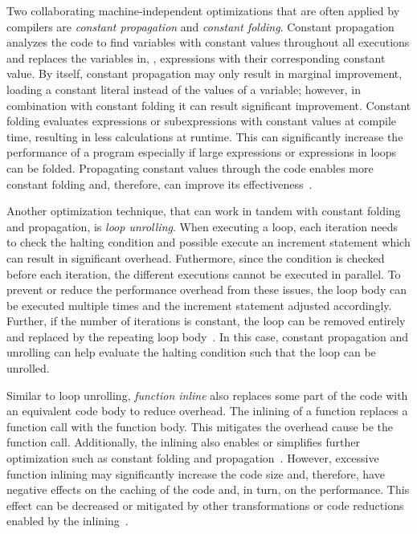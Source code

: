 Two collaborating machine-independent optimizations that are often applied by compilers are \emph{constant propagation} and \emph{constant folding}. Constant propagation analyzes the code to find variables with constant values throughout all executions and replaces the variables in, \eg, expressions with their corresponding constant value. By itself, constant propagation may only result in marginal improvement, loading a constant literal instead of the values of a variable; however, in combination with constant folding it can result significant improvement. Constant folding evaluates expressions or subexpressions with constant values at compile time, resulting in less calculations at runtime. This can significantly increase the performance of a program especially if large expressions or expressions in loops can be folded. Propagating constant values through the code enables more constant folding and, therefore, can improve its effectiveness~\cite{WeZa91}.

Another optimization technique, that can work in tandem with constant folding and propagation, is \emph{loop unrolling}. When executing a loop, each iteration needs to check the halting condition and possible execute an increment statement which can result in significant overhead. Futhermore, since the condition is checked before each iteration, the different executions cannot be executed in parallel. To prevent or reduce the performance overhead from these issues, the loop body can be executed multiple times and the increment statement adjusted accordingly. Further, if the number of iterations is constant, the loop can be removed entirely and replaced by the repeating loop body~\cite{HuLe99}. In this case, constant propagation and unrolling can help evaluate the halting condition such that the loop can be unrolled. 

Similar to loop unrolling, \emph{function inline} also replaces some part of the code with an equivalent code body to reduce overhead. The inlining of a function replaces a function call with the function body. This mitigates the overhead cause be the function call. Additionally, the inlining also enables or simplifies further optimization such as constant folding and propagation~\cite{TGS22}. However, excessive function inlining may significantly increase the code size and, therefore, have negative effects on the caching of the code and, in turn, on the performance. This effect can be decreased or mitigated by other transformations or code reductions enabled by the inlining~\cite{PeMa02}.

